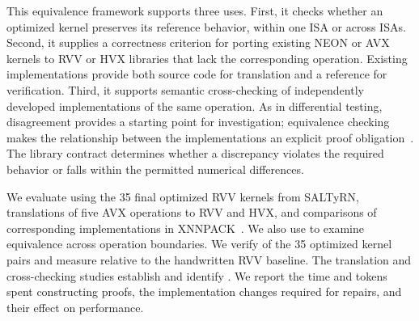 This equivalence framework supports three uses. First, it checks whether an optimized kernel preserves its reference behavior, within one ISA or across ISAs. Second, it supplies a correctness criterion for porting existing NEON or AVX kernels to RVV or HVX libraries that lack the corresponding operation. Existing implementations provide both source code for translation and a reference for verification. Third, it supports semantic cross-checking of independently developed implementations of the same operation. As in differential testing, disagreement provides a starting point for investigation; equivalence checking makes the relationship between the implementations an explicit proof obligation~\cite{mckeeman,symdiff}. The library contract determines whether a discrepancy violates the required behavior or falls within the permitted numerical differences.

We evaluate \tool using the 35 final optimized RVV kernels from SALTyRN, translations of five AVX operations to RVV and HVX, and comparisons of corresponding implementations in XNNPACK~\cite{final-kernels}. We also use  to examine equivalence across operation boundaries. We verify  of the 35 optimized kernel pairs and measure  relative to the handwritten RVV baseline. The translation and cross-checking studies establish  and identify . We report the time and tokens spent constructing proofs, the implementation changes required for repairs, and their effect on performance.

